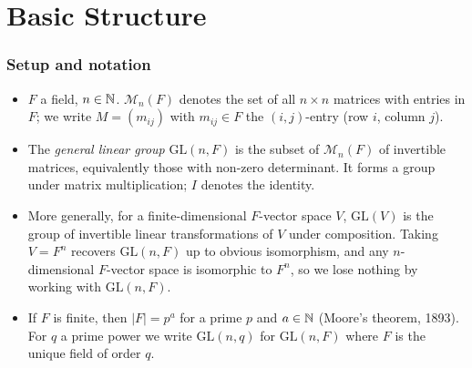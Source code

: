 \documentclass[../Odyssey_Project.tex]{subfiles}
\begin{document}
\setcounter{section}{3}
\section{Basic Structure}

\subsubsection*{Setup and notation}
\begin{itemize}
    \item $F$ a field, $n \in \mathbb{N}$. $\mathcal{M}_n(F)$ denotes the set of all $n \times n$ matrices with entries in $F$; we write $M = (m_{ij})$ with $m_{ij} \in F$ the $(i,j)$-entry (row $i$, column $j$).
    \item The \emph{general linear group} $\mathrm{GL}(n, F)$ is the subset of $\mathcal{M}_n(F)$ of invertible matrices, equivalently those with non-zero determinant. It forms a group under matrix multiplication; $I$ denotes the identity.
    \item More generally, for a finite-dimensional $F$-vector space $V$, $\mathrm{GL}(V)$ is the group of invertible linear transformations of $V$ under composition. Taking $V = F^n$ recovers $\mathrm{GL}(n, F)$ up to obvious isomorphism, and any $n$-dimensional $F$-vector space is isomorphic to $F^n$, so we lose nothing by working with $\mathrm{GL}(n, F)$.
    \item If $F$ is finite, then $|F| = p^a$ for a prime $p$ and $a \in \mathbb{N}$ (Moore's theorem, 1893). For $q$ a prime power we write $\mathrm{GL}(n, q)$ for $\mathrm{GL}(n, F)$ where $F$ is the unique field of order $q$.
\end{itemize}
\end{document}
